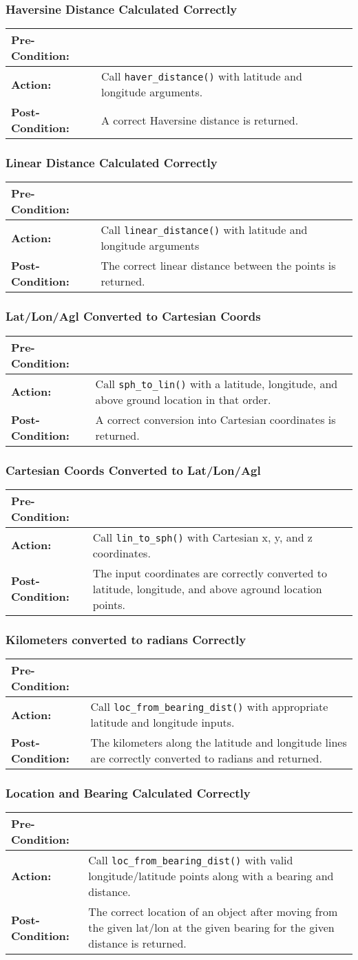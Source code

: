 \documentclass[titlepage]{article}
\newcommand{\testcase}[3]{
    \begin{center}
    \begin{tabular}{| l | p{0.7\textwidth}|}
        \hline
        \rowcolor[gray]{0.8}\textbf{Pre-Condition:} & #1 \\ \hline
        \textbf{Action:} & #2 \\ \hline
        \rowcolor[gray]{0.8}\textbf{Post-Condition:} & #3 \\ \hline
    \end{tabular}
    \end{center}
}
\begin{document}
\subsubsection{Haversine Distance Calculated Correctly}
\testcase{}{Call \texttt{haver\_distance()} with latitude and longitude arguments.}{A correct Haversine distance is returned.}

\subsubsection{Linear Distance Calculated Correctly}
\testcase{}{Call \texttt{linear\_distance()} with latitude and longitude arguments}{The correct linear distance between the points is returned.}

\subsubsection{Lat/Lon/Agl Converted to Cartesian Coords}
\testcase{}{Call \texttt{sph\_to\_lin()} with a latitude, longitude, and above ground location in that order.}{A correct conversion into Cartesian coordinates is returned.}

\subsubsection{Cartesian Coords Converted to Lat/Lon/Agl}
\testcase{}{Call \texttt{lin\_to\_sph()} with Cartesian x, y, and z coordinates.}{The input coordinates are correctly converted to latitude, longitude, and above aground location points.}

\subsubsection{Kilometers converted to radians Correctly}
\testcase{}{Call \texttt{loc\_from\_bearing\_dist()} with appropriate latitude and longitude inputs.}{The kilometers along the latitude and longitude lines are correctly converted to radians and returned.}

\subsubsection{Location and Bearing Calculated Correctly}
\testcase{}{Call \texttt{loc\_from\_bearing\_dist()} with valid longitude/latitude points along with a bearing and
distance.}{The correct location of an object after moving from the given lat/lon at the given bearing for the given
distance is returned.}
\end{document}
